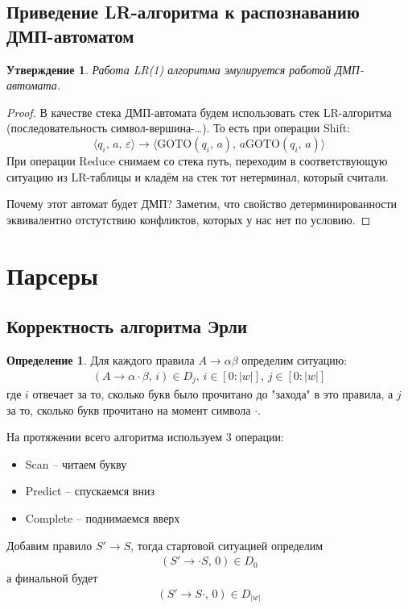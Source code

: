 \documentclass[a4paper,12pt]{article}
\theoremstyle{plain}
\newtheorem{proposition}{Утверждение}[subsection]
\theoremstyle{definition}
\newtheorem{definition}{Определение}[subsection]
\theoremstyle{remark}
\begin{document}
\subsection{Приведение LR-алгоритма к распознаванию ДМП-автоматом}
\begin{proposition}
	Работа LR(1) алгоритма эмулируется работой ДМП-автомата.
\end{proposition}

\begin{proof}
	В качестве стека ДМП-автомата будем использовать стек LR-алгоритма (последовательность символ-вершина-\dots). То есть при операции Shift:
	\[
		\langle q_i,\, a,\, \varepsilon\rangle \to \langle \text{GOTO}(q_i,\, a),\, a\text{GOTO}(q_i,\, a)\rangle
	\]
	При операции Reduce снимаем со стека путь, переходим в соответствующую ситуацию из LR-таблицы и кладём на стек тот нетерминал, который считали.

	Почему этот автомат будет ДМП? Заметим, что свойство детерминированности эквивалентно отстутствию конфликтов, которых у нас нет по условию.
\end{proof}

\section{Парсеры}
\subsection{Корректность алгоритма Эрли}
\begin{definition}
	Для каждого правила $A \to \alpha\beta$ определим ситуацию:
	\begin{align*}
		(A \to \alpha\cdot\beta,\, i) \in D_j,\, i \in [0 : \vert w\vert],\, j \in [0 : \vert w\vert]
	\end{align*}
	где $i$ отвечает за то, сколько букв было прочитано до "захода" в это правила, а $j$ за то, сколько букв прочитано на момент символа $\cdot$.
\end{definition}

На протяжении всего алгоритма используем 3 операции:
\begin{itemize}
	\item Scan -- читаем букву
	\item Predict -- спускаемся вниз
	\item Complete -- поднимаемся вверх
\end{itemize}

Добавим правило $S' \to S$, тогда стартовой ситуацией определим
\begin{align*}
	(S' \to \cdot S,\, 0) \in D_0
\end{align*}
а финальной будет
\begin{align*}
	(S' \to S\cdot,\, 0) \in D_{\vert w\vert}
\end{align*}
\end{document}

